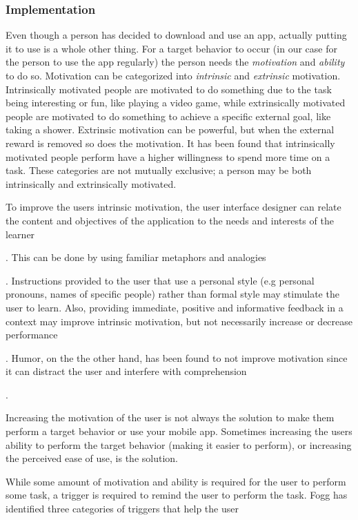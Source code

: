 \subsubsection{Implementation}
Even though a person has decided to download and use an app, actually putting it to use is a whole other thing. For a target behavior to occur (in our case for the person to use the app regularly) the person needs the \textit{motivation} and \textit{ability} to do so. Motivation can be categorized into \textit{intrinsic} and \textit{extrinsic} motivation. Intrinsically motivated people are motivated to do something due to the task being interesting or fun, like playing a video game, while extrinsically motivated people are motivated to do something to achieve a specific external goal, like taking a shower. Extrinsic motivation can be powerful, but when the external reward is removed so does the motivation. It has been found that intrinsically motivated people perform have a higher willingness to spend more time on a task. These categories are not mutually exclusive; a person may be both intrinsically and extrinsically motivated.

To improve the users intrinsic motivation, the user interface designer can relate the content and objectives of the application to the needs and interests of the learner . This can be done by using familiar metaphors and analogies . Instructions provided to the user that use a personal style (e.g personal pronouns, names of specific people) rather than formal style may stimulate the user to learn. Also, providing immediate, positive and informative feedback in a context may improve intrinsic motivation, but not necessarily increase or decrease performance . Humor, on the the other hand, has been found to not improve motivation since it can distract the user and interfere with comprehension .

Increasing the motivation of the user is not always the solution to make them perform a target behavior or use your mobile app. Sometimes increasing the users ability to perform the target behavior (making it easier to perform), or increasing the perceived ease of use, is the solution.

While some amount of motivation and ability is required for the user to perform some task, a trigger is required to remind the user to perform the task. Fogg has identified three categories of triggers that help the user

